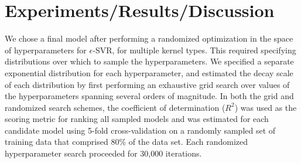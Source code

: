 \documentclass[12]{article}
\begin{document}
\section*{Experiments/Results/Discussion}

\noindent We chose a final model after performing a randomized optimization in the space of hyperparameters for $\epsilon$-SVR, for multiple kernel types. This required specifying distributions over which to sample the hyperparameters. We specified a separate exponential distribution for each hyperparameter, and estimated the decay scale of each distribution by first performing an exhaustive grid search over values of the hyperparameters spanning several orders of magnitude. In both the grid and randomized search schemes, the coefficient of determination ($R^2$) was used as the scoring metric for ranking all sampled models and was estimated for each candidate model using 5-fold cross-validation on a randomly sampled set of training data that comprised 80\% of the data set. Each randomized hyperparameter search proceeded for 30,000 iterations.\\ 
\end{document}
